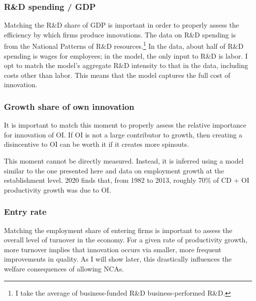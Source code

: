 \documentclass[11pt,english]{article}
\theoremstyle{remark}
\begin{document}
\subsubsection{R\&D spending / GDP}

Matching the R\&D share of GDP is important in order to properly assess the efficiency by which firms produce innovations. The data on R\&D spending is from the National Patterns of R\&D resources.\footnote{I take the average of business-funded R\&D business-performed R\&D.} In the data, about half of R\&D spending is wages for employees; in the model, the only input to R\&D is labor. I opt to match the model's aggregate R\&D intensity to that in the data, including costs other than labor. This means that the model captures the full cost of innovation. 

\subsubsection{Growth share of own innovation}

It is important to match this moment to properly assess the relative importance for innovation of OI. If OI is not a large contributor to growth, then creating a disincentive to OI can be worth it if it creates more spinouts. 

This moment cannot be directly measured. Instead, it is inferred using a model similar to the one presented here and data on employment growth at the establishment level. \cite{klenow_innovative_2020} 2020 finds that, from 1982 to 2013, roughly 70\% of CD + OI productivity growth was due to OI. 

\subsubsection{Entry rate}

Matching the employment share of entering firms is important to assess the overall level of turnover in the economy. For a given rate of productivity growth, more turnover implies that innovation occurs via smaller, more frequent improvements in quality. As I will show later, this drastically influences the welfare consequences of allowing NCAs.
\end{document}
